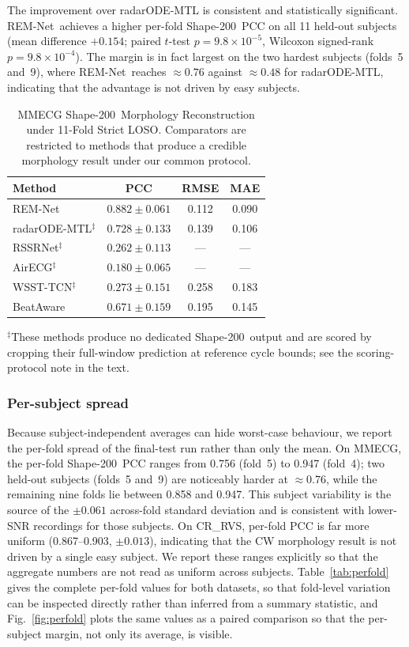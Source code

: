 \documentclass[lettersize,journal]{IEEEtran}
\newcommand{\remnet}{REM-Net\xspace}
\newcommand{\shape}{Shape-200\xspace}
\newcommand{\crrvs}{CR\_RVS\xspace}
\begin{document}
The improvement over radarODE-MTL is consistent and statistically significant. \remnet\ achieves a higher per-fold \shape\ PCC on all 11 held-out subjects (mean difference $+0.154$; paired $t$-test $p=9.8\times10^{-5}$, Wilcoxon signed-rank $p=9.8\times10^{-4}$). The margin is in fact largest on the two hardest subjects (folds~5 and~9), where \remnet\ reaches $\approx0.76$ against $\approx0.48$ for radarODE-MTL, indicating that the advantage is not driven by easy subjects.

\begin{table}[!t]
\centering
\caption{MMECG \shape\ Morphology Reconstruction under 11-Fold Strict LOSO. Comparators
are restricted to methods that produce a credible morphology result under our common
protocol.}
\label{tab:mmecg}
\begin{tabular}{lccc}
\toprule
Method & PCC & RMSE & MAE \\
\midrule
\remnet & $\mathbf{0.882 \pm 0.061}$ & 0.112 & 0.090 \\
radarODE-MTL$^{\ddagger}$ & $0.728 \pm 0.133$ & 0.139 & 0.106 \\
RSSRNet$^{\ddagger}$ & $0.262 \pm 0.113$ & --- & --- \\
AirECG$^{\ddagger}$ & $0.180 \pm 0.065$ & --- & --- \\
WSST-TCN$^{\ddagger}$ & $0.273 \pm 0.151$ & 0.258 & 0.183 \\
BeatAware &$0.671 \pm 0.159$ & 0.195 & 0.145 \\
\bottomrule
\end{tabular}

\vspace{2pt}
\footnotesize$^{\ddagger}$These methods produce no dedicated \shape\ output and are scored by cropping
their full-window prediction at reference cycle bounds; see the scoring-protocol note in the text.
\end{table}

\subsubsection{Per-subject spread}
Because subject-independent averages can hide worst-case behaviour, we report the
per-fold spread of the final-test run rather than only the mean. On MMECG, the
per-fold \shape\ PCC ranges from 0.756 (fold~5) to 0.947 (fold~4); two held-out subjects
(folds~5 and~9) are noticeably harder at $\approx$0.76, while the remaining nine folds lie
between 0.858 and 0.947. This subject variability is the source of the $\pm0.061$
across-fold standard deviation and is consistent with lower-SNR recordings for those
subjects. On \crrvs, per-fold PCC is far more uniform (0.867--0.903, $\pm0.013$),
indicating that the CW morphology result is not driven by a single easy subject. We
report these ranges explicitly so that the aggregate numbers are not read as uniform
across subjects. Table~\ref{tab:perfold} gives the complete per-fold values for both
datasets, so that fold-level variation can be inspected directly rather than inferred
from a summary statistic, and Fig.~\ref{fig:perfold} plots the same values as a paired
comparison so that the per-subject margin, not only its average, is visible.
\end{document}
